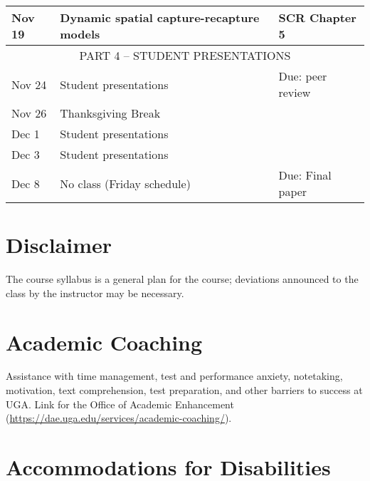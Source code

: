 \documentclass[12pt]{article}
\begin{document}
\begin{center}
\begin{tabular}[c]{lll}
Nov 19     & Dynamic spatial capture-recapture models     & SCR Chapter 5                    \\
\hline
           \multicolumn{3}{c}{PART 4 -- STUDENT PRESENTATIONS}                                    \\
\hline
Nov 24     & Student presentations                        & Due: peer review                 \\
Nov 26     & Thanksgiving Break                           &                                  \\
\hline
Dec 1      & Student presentations                        &                                  \\
Dec 3      & Student presentations                        &                                  \\
\hline
Dec 8      & No class (Friday schedule)                   & Due: Final paper                 \\
\hline \hline
\end{tabular}
\end{center}


\clearpage


\vspace{-2mm}
\section*{\normalsize Disclaimer}
\vspace{-4mm}

The course syllabus is a general plan for the course; deviations
announced to the class by the instructor may be necessary. 


\vspace{-2mm}
\section*{\normalsize Academic Coaching}
\vspace{-4mm}

Assistance with time management, test and performance anxiety,
notetaking, motivation, text comprehension, test preparation, and
other barriers to success at UGA. Link for the Office of Academic
Enhancement (\url{https://dae.uga.edu/services/academic-coaching/}). 

\vspace{-2mm}
\section*{\normalsize Accommodations for Disabilities}
\vspace{-4mm}
\end{document}
